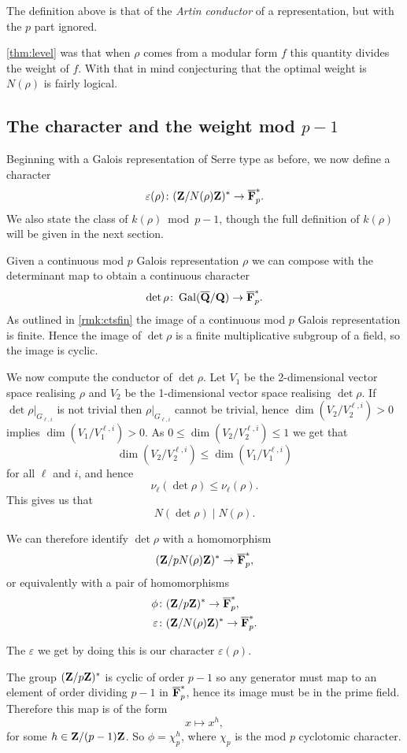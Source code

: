 \documentclass[a4paper,12pt]{article}
\begin{document}
The definition above is that of the \emph{Artin conductor} of a representation, but with the $p$ part ignored. %

\cref{thm:level} was that when $\rho$ comes from a modular form $f$ this quantity divides the weight of $f$.
With that in mind conjecturing that the optimal weight is $N(\rho)$ is fairly logical.


\subsection{The character and the weight mod $p-1$}
Beginning with a Galois representation of Serre type as before, we now define a character
\[
\varepsilon(\rho)\colon  (\mathbf{Z}/N(\rho)\mathbf{Z})^* \to \overline{\mathbf{F}}_p^*.
\]
We also state the class of $k(\rho)$~mod~$p-1$, though the full definition of $k(\rho)$ will be given in the next section.

Given a continuous mod $p$ Galois representation $\rho$ we can compose with the determinant map to obtain a continuous character
\[
\det \rho\colon \operatorname{Gal}(\overline{\mathbf{Q}}/\mathbf{Q}) \to \overline{\mathbf{F}}_p^*.
\]
As outlined in \cref{rmk:ctsfin} the image of a continuous mod $p$ Galois representation is finite.
Hence the image of $\det \rho$ is a finite multiplicative subgroup of a field, so the image is cyclic.

We now compute the conductor of $\det\rho$.
Let $V_1$ be the 2-dimensional vector space realising $\rho$ and $V_2$ be the 1-dimensional vector space realising $\det\rho$.
If $\det\rho|_{G_{\ell, i}}$ is not trivial then $\rho|_{G_{\ell,i}}$ cannot be trivial, hence $\dim(V_2/V_2^{\ell,i}) > 0$ implies $\dim(V_1/V_1^{\ell,i}) > 0$.
As $0 \le \dim(V_2/V_2^{\ell,i}) \le 1$ we get that
\[
\dim(V_2/V_2^{\ell,i})\le \dim(V_1/V_1^{\ell,i})
\]
for all $\ell$ and $i$, and hence
\[
\nu_\ell(\det\rho) \le \nu_\ell(\rho).
\]
This gives us that
\[
N(\det\rho) \mid N(\rho).
\]


We can therefore identify $\det\rho$ with a homomorphism
\[
(\mathbf{Z}/pN(\rho)\mathbf{Z})^* \to \overline{\mathbf{F}}_p^*,
\]
or equivalently with a pair of homomorphisms
\begin{align*}
\phi\colon& (\mathbf{Z}/p\mathbf{Z})^* \to \overline{\mathbf{F}}_p^*,\\
\varepsilon\colon& (\mathbf{Z}/N(\rho)\mathbf{Z})^* \to \overline{\mathbf{F}}_p^*.
\end{align*}

The $\varepsilon$ we get by doing this is our character $\varepsilon(\rho)$.

The group $(\mathbf{Z}/p\mathbf{Z})^*$ is cyclic of order $p-1$ so any generator must map to an element of order dividing $p-1$ in $\overline{\mathbf{F}}_p^*$, hence its image must be in the prime field.
Therefore this map is of the form
\[
x \mapsto x^h,
\]
for some $h \in \mathbf{Z}/(p-1)\mathbf{Z}$.
So $\phi = \chi_p^h$, where $\chi_p$ is the mod $p$ cyclotomic character. %
\end{document}
